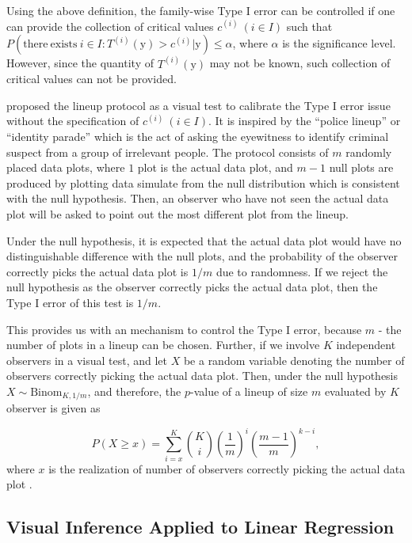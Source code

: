 \documentclass{monashthesis}
\begin{document}
Using the above definition, the family-wise Type I error can be controlled if one can provide the collection of critical values \(c^{(i)}~(i \in I)\) such that \(P(\mathrm{there~exists~} i \in I: T^{(i)}(\boldsymbol{\mathrm{y}}) > c^{(i)}|\boldsymbol{\mathrm{y}}) \leq \alpha\), where \(\alpha\) is the significance level. However, since the quantity of \(T^{(i)}(\boldsymbol{\mathrm{y}})\) may not be known, such collection of critical values can not be provided.

\textcite{buja_statistical_2009} proposed the lineup protocol as a visual test to calibrate the Type I error issue without the specification of \(c^{(i)}~(i \in I)\). It is inspired by the ``police lineup'' or ``identity parade'' which is the act of asking the eyewitness to identify criminal suspect from a group of irrelevant people. The protocol consists of \(m\) randomly placed data plots, where \(1\) plot is the actual data plot, and \(m-1\) null plots are produced by plotting data simulate from the null distribution which is consistent with the null hypothesis. Then, an observer who have not seen the actual data plot will be asked to point out the most different plot from the lineup.

Under the null hypothesis, it is expected that the actual data plot would have no distinguishable difference with the null plots, and the probability of the observer correctly picks the actual data plot is \(1/m\) due to randomness. If we reject the null hypothesis as the observer correctly picks the actual data plot, then the Type I error of this test is \(1/m\).

This provides us with an mechanism to control the Type I error, because \(m\) - the number of plots in a lineup can be chosen. Further, if we involve \(K\) independent observers in a visual test, and let \(X\) be a random variable denoting the number of observers correctly picking the actual data plot. Then, under the null hypothesis \(X \sim \mathrm{Binom}_{K,1/m}\), and therefore, the \(p\)-value of a lineup of size \(m\) evaluated by \(K\) observer is given as

\[P(X \geq x) = \sum_{i=x}^{K}{{K}\choose{i}}\left(\frac{1}{m}\right)^i\left(\frac{m-1}{m}\right)^{k-i},\]
where \(x\) is the realization of number of observers correctly picking the actual data plot \autocite{majumder_validation_2013}.

\hypertarget{visual-inference-applied-to-linear-regression}{%
\subsection{Visual Inference Applied to Linear Regression}\label{visual-inference-applied-to-linear-regression}}
\end{document}
